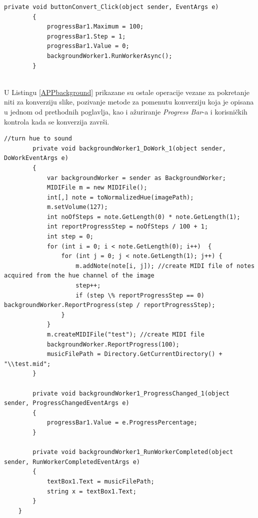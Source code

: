 \documentclass[12pt,a4paper]{article}
\begin{document}
\begin{lstlisting}[language={[Sharp]C}, caption={Pokretanje konverzije slike u audio \textit{file}}, label={APPconvert}]
private void buttonConvert_Click(object sender, EventArgs e)
        {
            progressBar1.Maximum = 100;
            progressBar1.Step = 1;
            progressBar1.Value = 0;
            backgroundWorker1.RunWorkerAsync();
        }
\end{lstlisting}
~\\

U Listingu \ref{APPbackground} prikazane su ostale operacije vezane za pokretanje niti za konverziju slike, pozivanje metode za pomenutu konverziju koja je opisana u jednom od prethodnih poglavlja, kao i ažuriranje \textit{Progress Bar}-a i korisničkih kontrola kada se konverzija završi.

\begin{lstlisting}[language={[Sharp]C}, caption={Vršenje konverzije u zasebnoj niti}, label={APPbackground}]
//turn hue to sound
        private void backgroundWorker1_DoWork_1(object sender, DoWorkEventArgs e)
        {
            var backgroundWorker = sender as BackgroundWorker;
            MIDIFile m = new MIDIFile();
            int[,] note = toNormalizedHue(imagePath);
            m.setVolume(127);
            int noOfSteps = note.GetLength(0) * note.GetLength(1);
            int reportProgressStep = noOfSteps / 100 + 1;
            int step = 0;
            for (int i = 0; i < note.GetLength(0); i++)  {
                for (int j = 0; j < note.GetLength(1); j++) {
                    m.addNote(note[i, j]); //create MIDI file of notes acquired from the hue channel of the image
                    step++;
                    if (step \% reportProgressStep == 0) backgroundWorker.ReportProgress(step / reportProgressStep);
                }
            }
            m.createMIDIFile("test"); //create MIDI file
            backgroundWorker.ReportProgress(100);
            musicFilePath = Directory.GetCurrentDirectory() + "\\test.mid";
        }

        private void backgroundWorker1_ProgressChanged_1(object sender, ProgressChangedEventArgs e)
        {
            progressBar1.Value = e.ProgressPercentage;
        }

        private void backgroundWorker1_RunWorkerCompleted(object sender, RunWorkerCompletedEventArgs e)
        {
            textBox1.Text = musicFilePath;
            string x = textBox1.Text;
        }
    }
\end{lstlisting}
~\\
\end{document}
